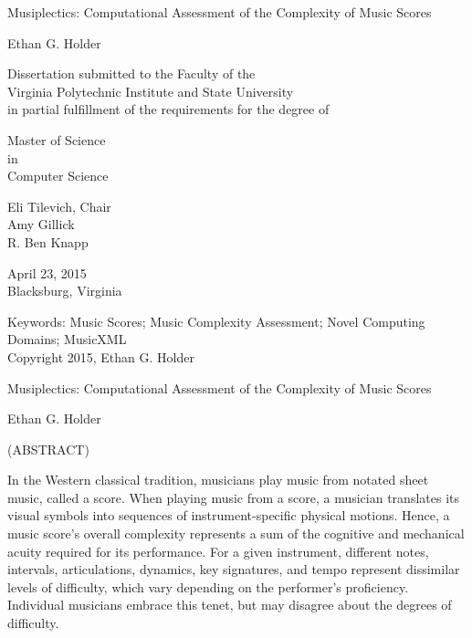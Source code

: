 \documentclass[12pt]{report}
\begin{document}
\thispagestyle{empty}
\begin{center}

{\Large 
Musiplectics: Computational Assessment of the Complexity of Music Scores
}

\vfill

Ethan G. Holder

\vfill

Dissertation submitted to the Faculty of the \\
Virginia Polytechnic Institute and State University \\
in partial fulfillment of the requirements for the degree of

\vfill

Master of Science \\
in \\
Computer Science

\vfill

Eli Tilevich, Chair \\
Amy Gillick \\
R. Ben Knapp

\vfill

April 23, 2015 \\
Blacksburg, Virginia

\vfill

Keywords: Music Scores; Music Complexity Assessment; Novel Computing Domains; MusicXML
\\
Copyright 2015, Ethan G. Holder

\end{center}

\pagebreak

\thispagestyle{empty}
\begin{center}

{\large Musiplectics: Computational Assessment of the Complexity of Music Scores}

\vfill

Ethan G. Holder

\vfill

(ABSTRACT)

\vfill

\end{center}

In the Western classical tradition, musicians play music from notated sheet music, called a score. When playing music from a score, a musician translates its visual symbols into sequences of instrument-specific physical motions. Hence, a music score's overall complexity represents a sum of the cognitive and mechanical acuity required for its performance.
For a given instrument, different notes, intervals, articulations, dynamics, key signatures, and tempo represent dissimilar levels of difficulty, which vary depending on the performer's proficiency. Individual musicians embrace this tenet, but may disagree about the degrees of difficulty.
\end{document}

